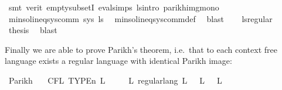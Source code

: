 \begin{isabellebody}
\ {\isacharparenleft}{\kern0pt}smt\ {\isacharparenleft}{\kern0pt}verit{\isacharparenright}{\kern0pt}\ empty{\isacharunderscore}{\kern0pt}subsetI\ eval{\isachardot}{\kern0pt}simps{\isacharparenleft}{\kern0pt}{}{\isacharparenright}{\kern0pt}\ ls{\isacharprime}{\kern0pt}{\isacharunderscore}{\kern0pt}intro\ parikh{\isacharunderscore}{\kern0pt}img{\isacharunderscore}{\kern0pt}mono{\isacharparenright}{\kern0pt}\isanewline
\ \ \isamarkupfalse%
\isanewline
\ \ \isamarkupfalse%
\ \isamarkupfalse%
\ {\isachardoublequoteopen}min{\isacharunderscore}{\kern0pt}sol{\isacharunderscore}{\kern0pt}ineq{\isacharunderscore}{\kern0pt}sys{\isacharunderscore}{\kern0pt}comm\ sys\ {\isacharquery}{\kern0pt}ls{\isacharprime}{\kern0pt}{\isachardoublequoteclose}\ \isamarkupfalse%
\ min{\isacharunderscore}{\kern0pt}sol{\isacharunderscore}{\kern0pt}ineq{\isacharunderscore}{\kern0pt}sys{\isacharunderscore}{\kern0pt}comm{\isacharunderscore}{\kern0pt}def\ \isamarkupfalse%
\ blast\isanewline
\ \ \isamarkupfalse%
\ ls{\isacharprime}{\kern0pt}{\isacharunderscore}{\kern0pt}regular\ \isamarkupfalse%
\ {\isacharquery}{\kern0pt}thesis\ \isamarkupfalse%
\ blast\isanewline
{}\isamarkupfalse%
%
\endisatagproof
{\isafoldproof}%
%
\isadelimproof
%
\endisadelimproof
%
\isadelimdocument
%
\endisadelimdocument
%
\isatagdocument
%
\isamarkuptrue%
%
\endisatagdocument
{\isafolddocument}%
%
\isadelimdocument
%
\endisadelimdocument
%
\begin{isamarkuptext}%
Finally we are able to prove Parikh's theorem, i.e.\ that to each context free language exists
a regular language with identical Parikh image:%
\end{isamarkuptext}\isamarkuptrue%
\isamarkupfalse%
\ Parikh{\isacharcolon}{\kern0pt}\isanewline
\ \ \ {\isachardoublequoteopen}CFL\ {\isacharparenleft}{\kern0pt}TYPE{\isacharparenleft}{\kern0pt}{\isacharprime}{\kern0pt}n{\isacharparenright}{\kern0pt}{\isacharparenright}{\kern0pt}\ L{\isachardoublequoteclose}\isanewline
\ \ \ \ \ {\isachardoublequoteopen}{\isasymexists}L{\isacharprime}{\kern0pt}{\isachardot}{\kern0pt}\ regular{\isacharunderscore}{\kern0pt}lang\ L{\isacharprime}{\kern0pt}\ {\isasymand}\ {\isasymPsi}\ L\ {\isacharequal}{\kern0pt}\ {\isasymPsi}\ L{\isacharprime}{\kern0pt}{\isachardoublequoteclose}\isanewline
%
\isadelimproof

\end{isabellebody}

